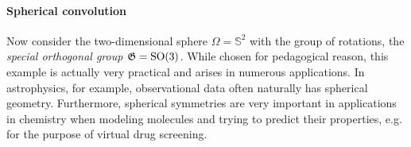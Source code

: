 \paragraph{Spherical convolution}
Now consider
the two-dimensional sphere $\Omega = \mathbb{S}^2$ with the group of rotations, the {\em special orthogonal group} ${\mathfrak{G}} = \mathrm{SO}(3)$.  
%
While chosen for pedagogical reason, this example is actually very practical and arises in numerous applications. In astrophysics, for example, observational data often naturally has spherical geometry. Furthermore, spherical symmetries are very important in applications in chemistry when modeling molecules and trying to predict their properties, e.g. for the purpose of virtual drug screening.



